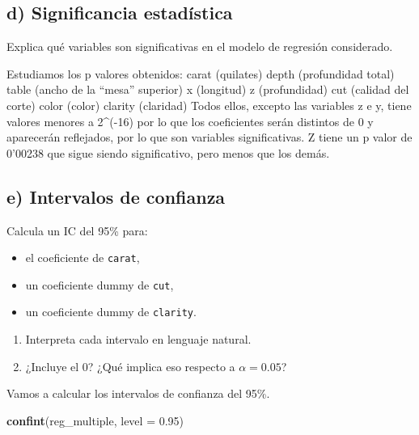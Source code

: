 \documentclass[
  spanish,
]{article}
\newenvironment{Shaded}{\begin{snugshade}}{\end{snugshade}}
\newcommand{\AttributeTok}[1]{\textcolor[rgb]{0.13,0.29,0.53}{#1}}
\newcommand{\FloatTok}[1]{\textcolor[rgb]{0.00,0.00,0.81}{#1}}
\newcommand{\FunctionTok}[1]{\textcolor[rgb]{0.13,0.29,0.53}{\textbf{#1}}}
\newcommand{\NormalTok}[1]{#1}
\providecommand{\tightlist}{%
  \setlength{\itemsep}{0pt}\setlength{\parskip}{0pt}}
\begin{document}
\subsection*{d) Significancia
estadística}\label{d-significancia-estaduxedstica}

Explica qué variables son significativas en el modelo de regresión
considerado.

Estudiamos los p valores obtenidos: carat (quilates) depth (profundidad
total) table (ancho de la ``mesa'' superior) x (longitud) z
(profundidad) cut (calidad del corte) color (color) clarity (claridad)
Todos ellos, excepto las variables z e y, tiene valores menores a
2\^{}(-16) por lo que los coeficientes serán distintos de 0 y aparecerán
reflejados, por lo que son variables significativas. Z tiene un p valor
de 0'00238 que sigue siendo significativo, pero menos que los demás.

\subsection*{e) Intervalos de
confianza}\label{e-intervalos-de-confianza}

Calcula un IC del 95\% para:

\begin{itemize}
\tightlist
\item
  el coeficiente de \texttt{carat},
\item
  un coeficiente dummy de \texttt{cut},
\item
  un coeficiente dummy de \texttt{clarity}.
\end{itemize}

\begin{enumerate}
\def\labelenumi{\arabic{enumi}.}
\tightlist
\item
  Interpreta cada intervalo en lenguaje natural.
\item
  ¿Incluye el 0? ¿Qué implica eso respecto a \(\alpha = 0.05\)?
\end{enumerate}

Vamos a calcular los intervalos de confianza del 95\%.

\begin{Shaded}
\begin{Highlighting}[]
\FunctionTok{confint}\NormalTok{(reg\_multiple, }\AttributeTok{level =} \FloatTok{0.95}\NormalTok{)}
\end{Highlighting}
\end{Shaded}
\end{document}

